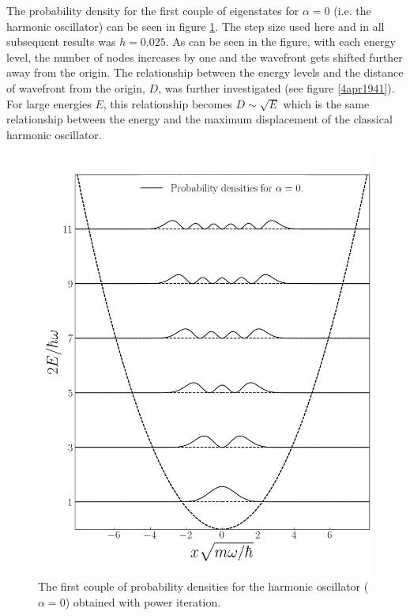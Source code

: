 \documentclass[twocolumn]{article}
\begin{document}
\begin{large}
The probability density for the first couple of eigenstates for $\alpha=0$ (i.e. the harmonic oscillator) can be seen in figure \ref{4apr0717}. The step size used here and in all subsequent results was $h=0.025$. As can be seen in the figure, with each energy level, the number of nodes increases by one and the wavefront gets shifted further away from the origin. The relationship between the energy levels and the distance of wavefront from the origin, $D$, was further investigated (see figure \ref{4apr1941}). For large energies $E$, this relationship becomes $D\sim\sqrt{E}$ which is the same relationship between the energy and the maximum displacement of the classical harmonic oscillator.
\begin{figure}[b!]
    \centering
    \includegraphics[scale=0.36]{har_osc_density.png}
    \caption{The first couple of probability densities for the harmonic oscillator ($\alpha=0$) obtained with power iteration.}
    \label{4apr0717}
\end{figure}


\end{large}
\end{document}
